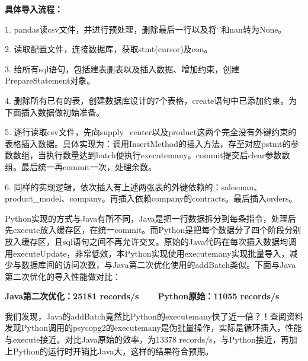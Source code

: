 \documentclass[11pt]{article}
\begin{document}
\hspace{-2em} \textbf{具体导入流程：}\par
\hspace{-1em}1. pandas读csv文件，并进行预处理，删除最后一行以及将‘’和nan转为None。\par
\hspace{-1em}2. 读取配置文件，连接数据库，获取stmt(cursor)及con。\par
\hspace{-1em}3. 给所有sql语句，包括建表删表以及插入数据、增加约束，创建PrepareStatement对象。\par
\hspace{-1em}4. 删除所有已有的表，创建数据库设计的7个表格，create语句中已添加约束。为下面插入数据做初始准备。\par
\hspace{-1em}5. 逐行读取csv文件，先向supply\_center以及product这两个完全没有外键约束的表格插入数据。具体实现为：调用InsertMethod的插入方法，存至对应pstmt的参数数组，当执行数量达到batch便执行executemany。commit提交后clear参数数组。最后统一再commit一次，处理余数。\par
\hspace{-1em}6. 同样的实现逻辑，依次插入有上述两张表的外键依赖的：salesman、product\_model、company。再插入依赖company的contracts。最后插入orders。\par

\hspace{-1em}\par
Python实现的方式与Java有所不同，Java是把一行数据拆分到每条指令，处理后先execute放入缓存区，在统一commit。而Python是把每个数据分了四个阶段分别放入缓存区，且sql语句之间不再允许交叉。原始的Java代码在每次插入数据均调用executeUpdate，非常低效，本Python实现使用executemany实现批量导入，减少与数据库间的访问次数，与Java第二次优化使用的addBatch类似。下面与Java第二次优化的导入性能做对比：\par
\hspace{-1em}\par
\hspace{2em}\textbf{Java第二次优化：25181 records/s\ \ \ \ Python原始：11055 records/s}\par
\hspace{-1em}\par
我们发现，Java的addBatch竟然比Python的executemany快了近一倍？！查阅资料发现Python调用的psycopg2的executemany是伪批量操作，实际是循环插入，性能与execute接近。对比Java原始的效率，为13378 records/s，与Python接近，再加上Python的运行时开销比Java大，这样的结果符合预期。
\end{document}
